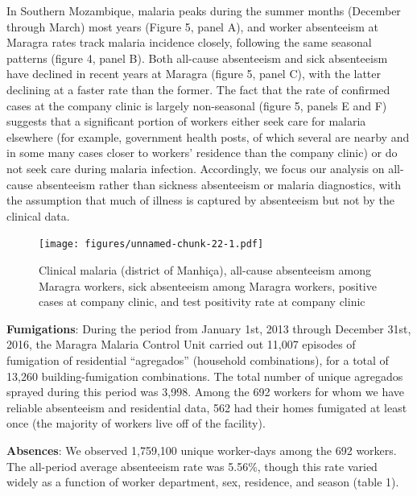 \documentclass[]{article}
\begin{document}
In Southern Mozambique, malaria peaks during the summer months (December
through March) most years (Figure 5, panel A), and worker absenteeism at
Maragra rates track malaria incidence closely, following the same
seasonal patterns (figure 4, panel B). Both all-cause absenteeism and
sick absenteeism have declined in recent years at Maragra (figure 5,
panel C), with the latter declining at a faster rate than the former.
The fact that the rate of confirmed cases at the company clinic is
largely non-seasonal (figure 5, panels E and F) suggests that a
significant portion of workers either seek care for malaria elsewhere
(for example, government health posts, of which several are nearby and
in some many cases closer to workers' residence than the company clinic)
or do not seek care during malaria infection. Accordingly, we focus our
analysis on all-cause absenteeism rather than sickness absenteeism or
malaria diagnostics, with the assumption that much of illness is
captured by absenteeism but not by the clinical data.

\begin{figure}
\centering
\texttt{[image: figures/unnamed-chunk-22-1.pdf]}
\caption{Clinical malaria (district of Manhiça), all-cause absenteeism
among Maragra workers, sick absenteeism among Maragra workers, positive
cases at company clinic, and test positivity rate at company clinic}
\end{figure}

\textbf{Fumigations}: During the period from January 1st, 2013 through
December 31st, 2016, the Maragra Malaria Control Unit carried out 11,007
episodes of fumigation of residential ``agregados'' (household
combinations), for a total of 13,260 building-fumigation combinations.
The total number of unique agregados sprayed during this period was
3,998. Among the 692 workers for whom we have reliable absenteeism and
residential data, 562 had their homes fumigated at least once (the
majority of workers live off of the facility).

\textbf{Absences}: We observed 1,759,100 unique worker-days among the
692 workers. The all-period average absenteeism rate was 5.56\%, though
this rate varied widely as a function of worker department, sex,
residence, and season (table 1).
\end{document}
